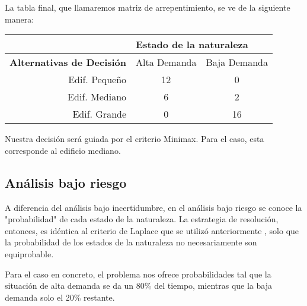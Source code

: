 La tabla final, que llamaremos matriz de arrepentimiento, se ve de la siguiente manera:

\begin{table}[H]
    \begin{tabular}{r|cc|}
        \cline{2-3}
        \multicolumn{1}{l|}{}                                   & \multicolumn{2}{l|}{\textbf{Estado de la naturaleza}}                                     \\ \hline
        \multicolumn{1}{|l|}{\textbf{Alternativas de Decisión}} & \multicolumn{1}{l|}{Alta Demanda}                     & \multicolumn{1}{l|}{Baja Demanda} \\ \hline
        \multicolumn{1}{|r|}{Edif. Pequeño}                     & \multicolumn{1}{c|}{12}                               & {\color[HTML]{333333} 0}          \\
        \multicolumn{1}{|r|}{Edif. Mediano}                     & \multicolumn{1}{c|}{6}                                & 2                                 \\
        \multicolumn{1}{|r|}{Edif. Grande}                      & \multicolumn{1}{c|}{{\color[HTML]{333333} 0}}         & 16                                \\ \hline
    \end{tabular}
\end{table}

Nuestra decisión será guiada por el criterio Minimax. Para el caso, esta corresponde al edificio mediano.

\subsection{Análisis bajo riesgo}
A diferencia del análisis bajo incertidumbre, en el análisis bajo riesgo se conoce la "probabilidad" de cada estado de la naturaleza. La estrategia de resolución, entonces, es idéntica al criterio de Laplace que se utilizó anteriormente , solo que la probabilidad de los estados de la naturaleza no necesariamente son equiprobable.

Para el caso en concreto, el problema nos ofrece probabilidades tal que la situación de alta demanda se da un 80\% del tiempo, mientras que la baja demanda solo el 20\% restante.


